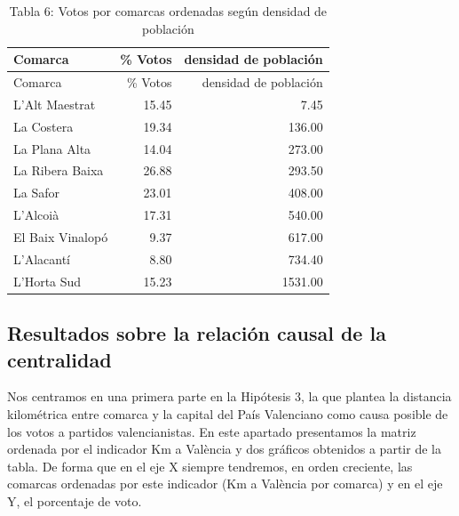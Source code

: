 \documentclass[
]{article}
\begin{document}
\begin{longtable}[]{@{}lrr@{}}
\caption{Tabla 6: Votos por comarcas ordenadas según densidad de
población}\tabularnewline
\toprule\noalign{}
Comarca & \% Votos & densidad de población \\
\midrule\noalign{}
\endfirsthead
\toprule\noalign{}
Comarca & \% Votos & densidad de población \\
\midrule\noalign{}
\endhead
\bottomrule\noalign{}
\endlastfoot
L'Alt Maestrat & 15.45 & 7.45 \\
La Costera & 19.34 & 136.00 \\
La Plana Alta & 14.04 & 273.00 \\
La Ribera Baixa & 26.88 & 293.50 \\
La Safor & 23.01 & 408.00 \\
L'Alcoià & 17.31 & 540.00 \\
El Baix Vinalopó & 9.37 & 617.00 \\
L'Alacantí & 8.80 & 734.40 \\
L'Horta Sud & 15.23 & 1531.00 \\
\end{longtable}

\hypertarget{resultados-sobre-la-relaciuxf3n-causal-de-la-centralidad}{%
\subsection{Resultados sobre la relación causal de la
centralidad}\label{resultados-sobre-la-relaciuxf3n-causal-de-la-centralidad}}

Nos centramos en una primera parte en la Hipótesis 3, la que plantea la
distancia kilométrica entre comarca y la capital del País Valenciano
como causa posible de los votos a partidos valencianistas. En este
apartado presentamos la matriz ordenada por el indicador Km a València y
dos gráficos obtenidos a partir de la tabla. De forma que en el eje X
siempre tendremos, en orden creciente, las comarcas ordenadas por este
indicador (Km a València por comarca) y en el eje Y, el porcentaje de
voto.
\end{document}

